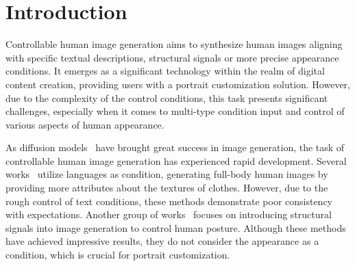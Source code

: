 \section{Introduction}

Controllable human image generation aims to synthesize human images aligning with specific textual descriptions, structural signals or more precise appearance conditions. It emerges as a significant technology within the realm of digital content creation, providing users with a portrait customization solution. However, due to the complexity of the control conditions, this task presents significant challenges, especially when it comes to multi-type condition input and control of various aspects of human appearance.

As diffusion models~\cite{ho2020ddpm,rombach2022ldm,ramesh2022dalle2,saharia2022imagen,nichol2022glide,dhariwal2021diffusionbeatgans} have brought great success in image generation, the task of controllable human image generation has experienced rapid development. Several works~\cite{jiang2022text2human} utilize languages as condition, generating full-body human images by providing more attributes about the textures of clothes. However, due to the rough control of text conditions, these methods demonstrate poor consistency with expectations. Another group of works~\cite{zhang2023controlnet, mou2023t2iadapter, zhao2024unicontrolnet, liu2023hyperhuman} focuses on introducing structural signals into image generation to control human posture. Although these methods have achieved impressive results, they do not consider the appearance as a condition, which is crucial for portrait customization.

